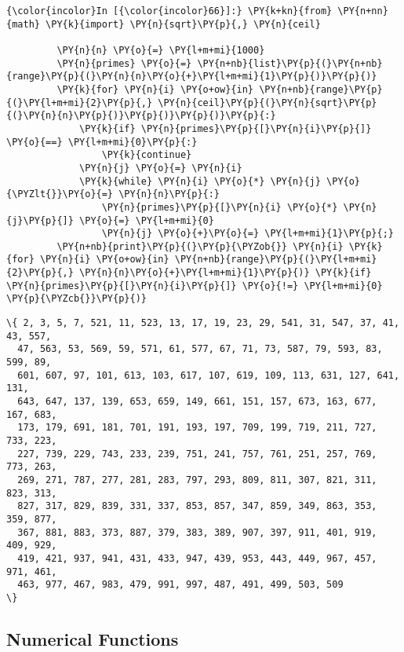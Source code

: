\begin{Verbatim}[commandchars=\\\{\}]
{\color{incolor}In [{\color{incolor}66}]:} \PY{k+kn}{from} \PY{n+nn}{math} \PY{k}{import} \PY{n}{sqrt}\PY{p}{,} \PY{n}{ceil}
         
         \PY{n}{n} \PY{o}{=} \PY{l+m+mi}{1000}
         \PY{n}{primes} \PY{o}{=} \PY{n+nb}{list}\PY{p}{(}\PY{n+nb}{range}\PY{p}{(}\PY{n}{n}\PY{o}{+}\PY{l+m+mi}{1}\PY{p}{)}\PY{p}{)}
         \PY{k}{for} \PY{n}{i} \PY{o+ow}{in} \PY{n+nb}{range}\PY{p}{(}\PY{l+m+mi}{2}\PY{p}{,} \PY{n}{ceil}\PY{p}{(}\PY{n}{sqrt}\PY{p}{(}\PY{n}{n}\PY{p}{)}\PY{p}{)}\PY{p}{)}\PY{p}{:}
             \PY{k}{if} \PY{n}{primes}\PY{p}{[}\PY{n}{i}\PY{p}{]} \PY{o}{==} \PY{l+m+mi}{0}\PY{p}{:}
                 \PY{k}{continue}
             \PY{n}{j} \PY{o}{=} \PY{n}{i}
             \PY{k}{while} \PY{n}{i} \PY{o}{*} \PY{n}{j} \PY{o}{\PYZlt{}}\PY{o}{=} \PY{n}{n}\PY{p}{:}
                 \PY{n}{primes}\PY{p}{[}\PY{n}{i} \PY{o}{*} \PY{n}{j}\PY{p}{]} \PY{o}{=} \PY{l+m+mi}{0}
                 \PY{n}{j} \PY{o}{+}\PY{o}{=} \PY{l+m+mi}{1}\PY{p}{;}
         \PY{n+nb}{print}\PY{p}{(}\PY{p}{\PYZob{}} \PY{n}{i} \PY{k}{for} \PY{n}{i} \PY{o+ow}{in} \PY{n+nb}{range}\PY{p}{(}\PY{l+m+mi}{2}\PY{p}{,} \PY{n}{n}\PY{o}{+}\PY{l+m+mi}{1}\PY{p}{)} \PY{k}{if} \PY{n}{primes}\PY{p}{[}\PY{n}{i}\PY{p}{]} \PY{o}{!=} \PY{l+m+mi}{0} \PY{p}{\PYZcb{}}\PY{p}{)}
\end{Verbatim}


\begin{Verbatim}[commandchars=\\\{\}]
\{ 2, 3, 5, 7, 521, 11, 523, 13, 17, 19, 23, 29, 541, 31, 547, 37, 41, 43, 557,
  47, 563, 53, 569, 59, 571, 61, 577, 67, 71, 73, 587, 79, 593, 83, 599, 89,
  601, 607, 97, 101, 613, 103, 617, 107, 619, 109, 113, 631, 127, 641, 131,
  643, 647, 137, 139, 653, 659, 149, 661, 151, 157, 673, 163, 677, 167, 683,
  173, 179, 691, 181, 701, 191, 193, 197, 709, 199, 719, 211, 727, 733, 223,
  227, 739, 229, 743, 233, 239, 751, 241, 757, 761, 251, 257, 769, 773, 263,
  269, 271, 787, 277, 281, 283, 797, 293, 809, 811, 307, 821, 311, 823, 313,
  827, 317, 829, 839, 331, 337, 853, 857, 347, 859, 349, 863, 353, 359, 877,
  367, 881, 883, 373, 887, 379, 383, 389, 907, 397, 911, 401, 919, 409, 929,
  419, 421, 937, 941, 431, 433, 947, 439, 953, 443, 449, 967, 457, 971, 461,
  463, 977, 467, 983, 479, 991, 997, 487, 491, 499, 503, 509
\}
\end{Verbatim}

\subsection{Numerical Functions}\label{numerical-functions}


